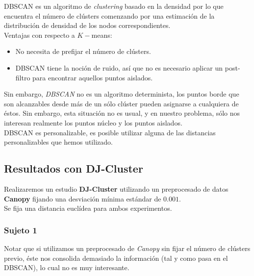 \documentclass[a4paper, 12pt]{article}
\begin{document}
DBSCAN es un algoritmo de \textit{clustering} basado en la densidad por lo que encuentra el n\'umero de cl\'usters comenzando por una estimaci\'on de la distribuci\'on de densidad de los nodos correspondientes.\\

Ventajas con respecto a $K-$means:

\begin{itemize}
	\item No necesita de prefijar el n\'umero de cl\'usters.
	\item DBSCAN tiene la noci\'on de ruido, as\'i que no es necesario aplicar un post-filtro para encontrar aquellos puntos aislados. 
\end{itemize}

Sin embargo, \textit{DBSCAN} no es un algoritmo determinista, los puntos borde que son alcanzables desde m\'as de un s\'olo cl\'uster pueden asignarse a cualquiera de \'estos. Sin embargo, esta situaci\'on no es usual, y en nuestro problema, s\'olo nos interesan realmente los puntos n\'ucleo y los puntos aislados. \\

DBSCAN es personalizable, es posible utilizar alguna de las distancias personalizables que hemos utilizado. 

\subsection{Resultados con DJ-Cluster}

Realizaremos un estudio \textbf{DJ-Cluster} utilizando un preprocesado de datos \textbf{Canopy} fijando una desviaci\'on m\'inima est\'andar de $0.001$. \\

Se fija una distancia eucl\'idea para ambos experimentos.\\

\subsubsection{Sujeto 1}

Notar que si utilizamos un preprocesado de \textit{Canopy} sin fijar el n\'umero de cl\'usters previo, \'este nos consolida demasiado la informaci\'on (tal y como pasa en el DBSCAN), lo cual no es muy interesante.\\
\end{document}
